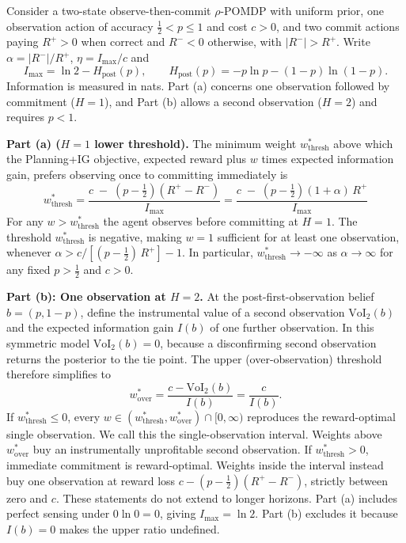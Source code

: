\documentclass[manuscript, screen, review]{jair}
\begin{document}
\begin{proposition}
\label{prop:nearopt}
Consider a two-state observe-then-commit $\rho$-POMDP with uniform prior, one observation action of accuracy $\tfrac12<p\le1$ and cost $c>0$, and two commit actions paying $R^+>0$ when correct and $R^-<0$ otherwise, with $|R^-|>R^+$. Write $\alpha=|R^-|/R^+$, $\eta=I_{\max}/c$ and
\[
I_{\max}=\ln2-H_{\mathrm{post}}(p),\qquad
H_{\mathrm{post}}(p)=-p\ln p-(1-p)\ln(1-p).
\]
Information is measured in nats. Part (a) concerns one observation followed by commitment ($H=1$), and Part (b) allows a second observation ($H=2$) and requires $p<1$.

\textbf{Part (a) ($H{=}1$ lower threshold).} The minimum weight $w^*_{\mathrm{thresh}}$ above which the Planning+IG objective, expected reward plus $w$ times expected information gain, prefers observing once to committing immediately is
\begin{equation*}
    w^*_{\mathrm{thresh}} = \frac{c \;-\; \left(p - \tfrac{1}{2}\right)(R^+ - R^-)}{\,I_{\max}\,} = \frac{c \;-\; \left(p - \tfrac{1}{2}\right)(1 + \alpha)\,R^+}{\,I_{\max}\,}
\end{equation*}
For any $w > w^*_{\mathrm{thresh}}$ the agent observes before committing at $H{=}1$. The threshold $w^*_{\mathrm{thresh}}$ is negative, making $w{=}1$ sufficient for at least one observation, whenever $\alpha > c / [(p - \tfrac{1}{2})\,R^+] - 1$. In particular, $w^*_{\mathrm{thresh}} \to -\infty$ as $\alpha \to \infty$ for any fixed $p > \tfrac{1}{2}$ and $c > 0$.

\textbf{Part (b): One observation at $H{=}2$.} At the post-first-observation belief $b{=}(p, 1{-}p)$, define the instrumental value of a second observation $\mathrm{VoI}_2(b)$ and the expected information gain $I(b)$ of one further observation. In this symmetric model $\mathrm{VoI}_2(b)=0$, because a disconfirming second observation returns the posterior to the tie point. The upper (over-observation) threshold therefore simplifies to
\begin{equation*}
    w^*_{\mathrm{over}} = \frac{c-\mathrm{VoI}_2(b)}{I(b)} = \frac{c}{I(b)}.
\end{equation*} If $w^*_{\mathrm{thresh}}\le0$, every $w\in(w^*_{\mathrm{thresh}},w^*_{\mathrm{over}})\cap[0,\infty)$ reproduces the reward-optimal single observation. We call this the single-observation interval. Weights above $w^*_{\mathrm{over}}$ buy an instrumentally unprofitable second observation. If $w^*_{\mathrm{thresh}}>0$, immediate commitment is reward-optimal. Weights inside the interval instead buy one observation at reward loss $c-(p-\tfrac12)(R^+-R^-)$, strictly between zero and $c$. These statements do not extend to longer horizons. Part (a) includes perfect sensing under $0\ln0=0$, giving $I_{\max}=\ln2$. Part (b) excludes it because $I(b)=0$ makes the upper ratio undefined.
\end{proposition}
\end{document}
